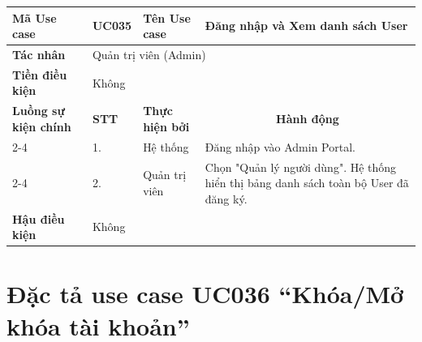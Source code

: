 \begin{longtable}{|p{2.7cm}|p{0.8cm}|p{2.6cm}|p{7.3cm}|}
\hline
\cellcolor[HTML]{D5F5E3}\textbf{Mã Use case} & \multicolumn{1}{l|}{UC035} & \cellcolor[HTML]{D5F5E3}\textbf{Tên Use case} & Đăng nhập và Xem danh sách User \\ \hline
\cellcolor[HTML]{D5F5E3}\textbf{Tác nhân} & \multicolumn{3}{p{10.7cm}|}{Quản trị viên (Admin)} \\ \hline
\cellcolor[HTML]{D5F5E3}\textbf{Tiền điều kiện} & \multicolumn{3}{p{10.7cm}|}{Không} \\ \hline

\cellcolor[HTML]{D5F5E3}\textbf{Luồng sự kiện chính} & \cellcolor[HTML]{FDEBD0}\textbf{STT} & \cellcolor[HTML]{FDEBD0}\textbf{Thực hiện bởi} & \multicolumn{1}{c|}{\cellcolor[HTML]{FDEBD0}\textbf{Hành động}} \\ \cline{2-4} 
\cellcolor[HTML]{D5F5E3} & 1. & Hệ thống & Đăng nhập vào Admin Portal. \\ \cline{2-4} 
\cellcolor[HTML]{D5F5E3} & 2. & Quản trị viên & Chọn "Quản lý người dùng". Hệ thống hiển thị bảng danh sách toàn bộ User đã đăng ký. \\ \hline

\cellcolor[HTML]{D5F5E3}\textbf{Hậu điều kiện} & \multicolumn{3}{p{10.7cm}|}{Không} \\ \hline
\end{longtable}
\endgroup

\section{Đặc tả use case UC036 ``Khóa/Mở khóa tài khoản''}
\vspace{0.5cm}

\begingroup
\renewcommand{\arraystretch}{1.5}

